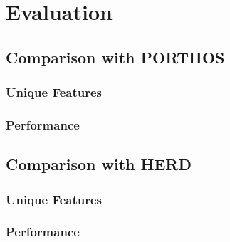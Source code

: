 \chapter{Evaluation}
\label{ch:eval}

\section{Comparison with PORTHOS}

\subsection{Unique Features}
\subsection{Performance}




\section{Comparison with HERD}

\subsection{Unique Features}
\subsection{Performance}

